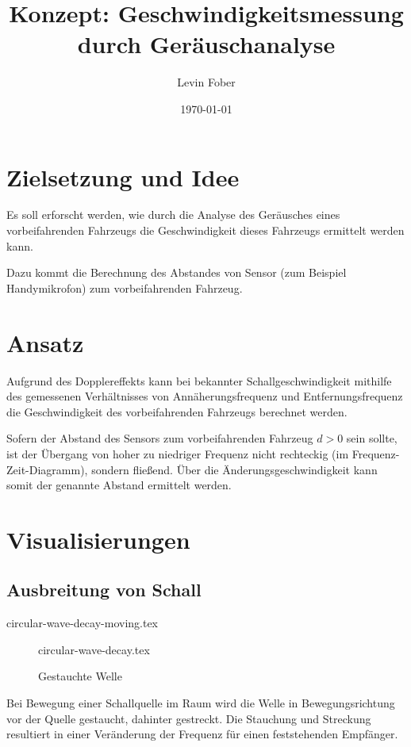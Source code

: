 \documentclass[12pt, a4paper]{article}
\title{Konzept: Ge\-schwin\-dig\-keits\-mes\-sung durch Ge\-räusch\-ana\-ly\-se}
\author{Levin Fober}
\date{\today}
\begin{document}
\maketitle

\tableofcontents

\newpage

\section{Zielsetzung und Idee}
Es soll erforscht werden, wie durch die Analyse des Geräusches eines
vorbeifahrenden Fahrzeugs die Geschwindigkeit dieses Fahrzeugs ermittelt werden
kann.

Dazu kommt die Berechnung des Abstandes von Sensor (zum Beispiel Handymikrofon)
zum vorbeifahrenden Fahrzeug.

\section{Ansatz}
Aufgrund des Dopplereffekts kann bei bekannter Schallgeschwindigkeit mithilfe
des gemessenen Verhältnisses von Annäherungsfrequenz und Entfernungsfrequenz die
Geschwindigkeit des vorbeifahrenden Fahrzeugs berechnet werden.

Sofern der Abstand des Sensors zum vorbeifahrenden Fahrzeug \(d > 0\) sein
sollte, ist der Übergang von hoher zu niedriger Frequenz nicht rechteckig (im
Frequenz-Zeit-Diagramm), sondern fließend. Über die Änderungsgeschwindigkeit
kann somit der genannte Abstand ermittelt werden.

\section{Visualisierungen}

\subsection{Ausbreitung von Schall}

{circular-wave-decay-moving.tex}

\begin{figure}
    \centering
    {circular-wave-decay.tex}
    \caption{Gestauchte Welle}
\end{figure}

\vspace{1cm}

Bei Bewegung einer Schallquelle im Raum wird die Welle in Bewegungsrichtung vor
der Quelle gestaucht, dahinter gestreckt. Die Stauchung und Streckung resultiert
in einer Veränderung der Frequenz für einen feststehenden Empfänger.
\end{document}
